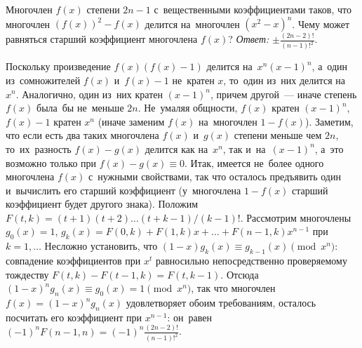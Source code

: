 \problem{}
Многочлен $f(x)$ степени $2 n - 1$ с~вещественными коэффициентами таков, что
многочлен $(f(x))^2 - f(x)$ делится на~многочлен $(x^2 - x)^n$.
Чему может равняться старший коэффициент многочлена $f(x)$?
\solution
\emph{Ответ:} $\pm \frac{(2n-2)!}{(n-1)!^2}$.
\par
Поскольку произведение $f(x) (f(x) - 1)$ делится на~$x^n (x - 1)^n$, а~один
из~сомножителей $f(x)$ и~$f(x) - 1$ не~кратен $x$, то~один из~них делится
на~$x^n$.
Аналогично, один из~них кратен $(x - 1)^n$, причем другой~--- иначе степень
$f(x)$ была~бы не~меньше $2 n$.
Не~умаляя общности, $f(x)$ кратен $(x - 1)^n$,
$f(x) - 1$ кратен $x^n$ (иначе заменим $f(x)$ на~многочлен $1 - f(x)$).
Заметим, что если есть два таких многочлена $f(x)$ и~$g(x)$ степени меньше чем
$2 n$, то~их~разность $f(x) - g(x)$ делится как на~$x^n$, так и~на~$(x - 1)^n$,
а~это возможно только при $f(x) - g(x) \equiv 0$.
Итак, имеется не~более одного многочлена $f(x)$ с~нужными свойствами, так что
осталось предъявить один и~вычислить его старший коэффициент
(у~многочлена $1 - f(x)$ старший коэффициент будет другого знака).
Положим $F(t, k) = (t + 1) (t + 2) \ldots (t + k - 1) / (k - 1)!$.
Рассмотрим многочлены
$g_0(x) = 1$, $g_k(x) = F(0, k) + F(1, k) x + \ldots + F(n - 1, k) x^{n-1}$
при $k = 1, \ldots$
Несложно установить, что $(1 - x) g_k(x) \equiv g_{k-1}(x) \pmod{x^n}$:
совпадение коэффициентов при $x^t$ равносильно непосредственно проверяемому
тождеству $F(t,k) - F(t -1, k) = F(t, k - 1)$.
Отсюда $(1 - x)^n g_n(x) \equiv g_0(x) = 1 \pmod{x^n}$,
так что многочлен $f(x) = (1 - x)^n g_n(x)$ удовлетворяет обоим требованиям,
осталось посчитать его коэффициент при $x^{n-1}$: он~равен
$(-1)^n F(n - 1, n) = (-1)^n \frac{(2 n - 2)!}{(n - 1)!^2}$.
\endproblem
